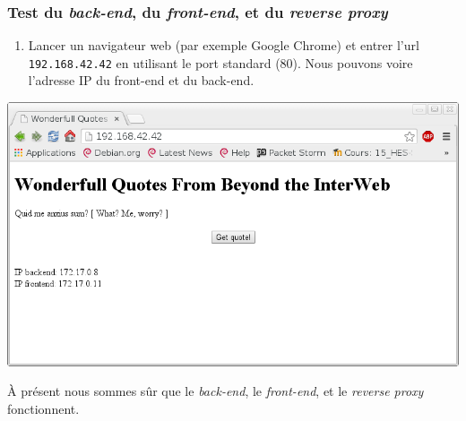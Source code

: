 \documentclass[a4paper,11pt,titlepage]{article}
\begin{document}
\subsubsection{Test du \emph{back-end}, du \emph{front-end}, et du \emph{reverse proxy}}
\begin{enumerate}
	\item Lancer un navigateur web (par exemple Google Chrome) et entrer l'url \texttt{192.168.42.42} en utilisant le port standard (80).
Nous pouvons voire l'adresse IP du front-end et du back-end.
\end{enumerate}
\begin{center}
	\includegraphics[scale=0.5]{test1.png}
\end{center}

À présent nous sommes sûr que le \emph{back-end}, le \emph{front-end}, et le \emph{reverse proxy} fonctionnent.
\end{document}
